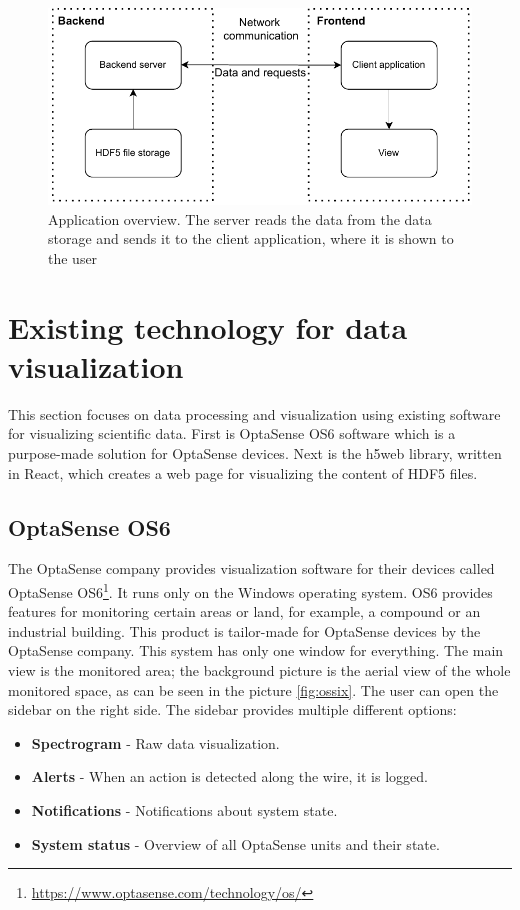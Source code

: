 \begin{figure}
    \centering
    \includegraphics{pdf/appstack_general.drawio.pdf}
    \caption{Application overview. The server reads the data from the data storage and sends it to the client application, where it is shown to the user}
    \label{fig:app_overview}
\end{figure}

\section{Existing technology for data visualization}

This section focuses on data processing and visualization using existing software for visualizing scientific data. First is OptaSense OS6 software which is a purpose-made solution for OptaSense devices. Next is the h5web library, written in React, which creates a web page for visualizing the content of HDF5 files.

\subsection{OptaSense OS6}\label{sec:ossix}

The OptaSense company provides visualization software for their devices called OptaSense OS6\footnote{\url{https://www.optasense.com/technology/os/}}. It runs only on the Windows operating system. OS6 provides features for monitoring certain areas or land, for example, a compound or an industrial building. This product is tailor-made for OptaSense devices by the OptaSense company. This system has only one window for everything. The main view is the monitored area; the background picture is the aerial view of the whole monitored space, as can be seen in the picture \ref{fig:ossix}. The user can open the sidebar on the right side. The sidebar provides multiple different options:

\begin{itemize}
    \item \textbf{Spectrogram} - Raw data visualization.
    \item \textbf{Alerts} - When an action is detected along the wire, it is logged.
    \item \textbf{Notifications} -  Notifications about system state.
    \item \textbf{System status} - Overview of all OptaSense units and their state.
\end{itemize}

